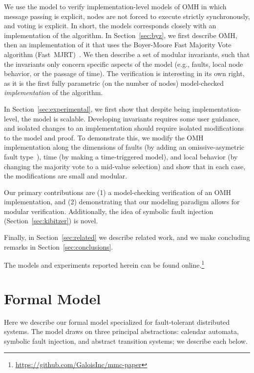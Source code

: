 \documentclass{llncs/llncs}
\newcommand{\OMH}{\ensuremath{\mathrm{OMH}}\xspace}
\begin{document}
We use the model to verify implementation-level models of $\OMH$ in which message passing is explicit, nodes are not forced to execute strictly synchronously, and voting is explicit. In short, the models corresponds closely with an implementation of the algorithm. In Section~\ref{sec:byz}, we first describe \OMH, then an implementation of it that uses the Boyer-Moore Fast Majority Vote algorithm (Fast~MJRT)~\cite{mjrty}. We then describe a set of modular invariants, such that the invariants only concern specific aspects of the model (e.g., faults, local node behavior, or the passage of time). The verification is interesting in its own right, as it is the first fully parametric (on the number of nodes) model-checked \emph{implementation} of the algorithm.

In Section~\ref{sec:experimental}, we first show that despite being implementation-level, the model is scalable. Developing invariants requires some user guidance, and isolated changes to an implementation should require isolated modifications to the model and proof. To demonstrate this, we modify the \OMH implementation along the dimensions of faults (by adding an omissive-asymetric fault type~\cite{omissive}), time (by making a time-triggered model), and local behavior (by changing the majority vote to a mid-value selection) and show that in each case, the modifications are small and modular.

Our primary contributions are (1) a model-checking verification of an $\OMH$ implementation, and (2) demonstrating that our modeling paradigm allows for modular verification. Additionally, the idea of symbolic fault injection (Section~\ref{sec:kibitzer}) is novel.

Finally, in Section~\ref{sec:related} we describe related work, and we make concluding remarks in Section~\ref{sec:conclusions}.

The models and experiments reported herein can be found online.\footnote{\url{https://github.com/GaloisInc/mmc-paper}}


\section{Formal Model}\label{sec:model}
Here we describe our formal model specialized for fault-tolerant distributed systems. The model draws on three principal abstractions: calendar automata, symbolic fault injection, and abstract transition systems; we describe each below.
\end{document}
